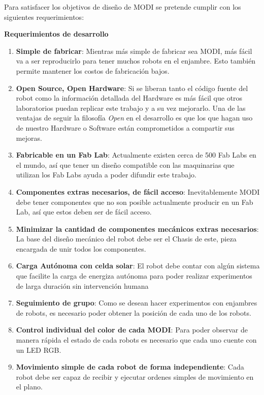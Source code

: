 Para satisfacer los objetivos de diseño de MODI se pretende cumplir con los siguientes requerimientos:

\textbf{Requerimientos de desarrollo}

\begin{enumerate}
\item \textbf{Simple de fabricar}: Mientras más simple de fabricar sea MODI, más fácil va a ser reproducirlo para tener muchos robots en el enjambre. Esto también permite mantener los costos de fabricación bajos. 
\item \textbf{Open Source, Open Hardware}: Si se liberan tanto el código fuente del robot como la información detallada del Hardware es más fácil que otros laboratorios puedan replicar este trabajo y a su vez mejorarlo. Una de las ventajas de seguir la filosofía \textit{Open} en el desarrollo es que los que hagan uso de nuestro Hardware o Software están comprometidos a compartir sus mejoras.
\item \textbf{Fabricable en un Fab Lab}: Actualmente existen cerca de 500 Fab Labs en el mundo, así que tener un diseño compatible con las maquinarias que utilizan los Fab Labs ayuda a poder difundir este trabajo.
\item \textbf{Componentes extras necesarios, de fácil acceso}: Inevitablemente MODI debe tener componentes que no son posible actualmente producir en un Fab Lab, así que estos deben ser de fácil acceso. 
\item \textbf{Minimizar la cantidad de componentes mecánicos extras necesarios}: La base del diseño mecánico del robot debe ser el Chasis de este, pieza encargada de unir todos los componentes.
\item \textbf{Carga Autónoma con celda solar}: El robot debe contar con algún sistema que facilite la carga de energiza autónoma para poder realizar experimentos de larga duración sin intervención humana
\item \textbf{Seguimiento de grupo}: Como se desean hacer experimentos con enjambres de robots, es necesario poder obtener la posición de cada uno de los robots.
\item \textbf{Control individual del color de cada MODI}: Para poder observar de manera rápida el estado de cada robots es necesario que cada uno cuente con un LED RGB.
\item \textbf{Movimiento simple de cada robot de forma independiente}: Cada robot debe ser capaz de recibir y ejecutar ordenes simples de movimiento en el plano.
\end{enumerate}

